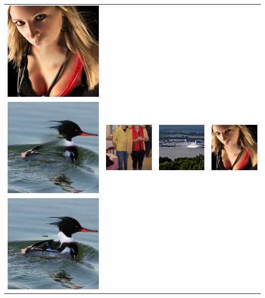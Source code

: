 \begin{longtable}{cccc}
  \includegraphics[width=.24\textwidth]{figures/imagenet/0197_ce2.jpg}\\
  \includegraphics[width=.24\textwidth]{figures/imagenet/0011_nps2.jpg}&
  \includegraphics[width=.24\textwidth]{figures/imagenet/0034_nps2.jpg}&
  \includegraphics[width=.24\textwidth]{figures/imagenet/0165_nps2.jpg}&
  \includegraphics[width=.24\textwidth]{figures/imagenet/0197_nps2.jpg}\\
  \includegraphics[width=.24\textwidth]{figures/imagenet/imagenet_0011_siggraph2017.png}&

\end{longtable}
